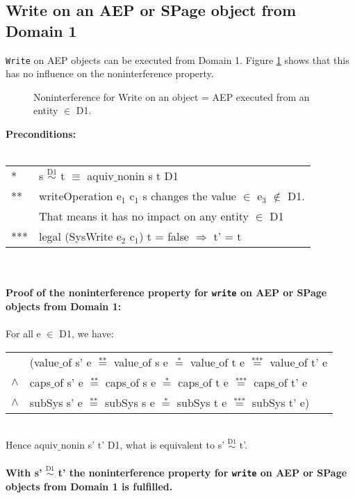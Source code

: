 \subsection{Write on an AEP or SPage object from Domain 1}\label{WriteOut2}
\texttt{Write} on AEP objects can be executed from Domain 1. Figure \ref{fig:WriteOut2} shows that this has no influence on the noninterference property.
\begin{figure}[H]
\caption{Noninterference for Write on an object = AEP executed from an entity $\in$ D1.}
\label{fig:WriteOut2}
\end{figure}
\textbf{Preconditions:} \\ \\
\begin{tabular}{ll}
* & s $\overset{\text{D1}}{\sim}$ t $\equiv$ aquiv$\_$nonin s t D1	\\ 
** & writeOperation e$_1$ c$_1$ s changes the value $\in$ e$_3$ $\notin$ D1. \\
& That means it has no impact on any entity $\in$ D1 \\ 
*** & legal (SysWrite e$_2$ c$_1$) t = false $\Rightarrow$ t' = t
\end{tabular} \\ \\ 
\textbf{Proof of the noninterference property for \texttt{write} on AEP or SPage objects from Domain 1:}\\ \\
For all e $\in$ D1, we have: \\ 
\begin{tabular}{ll}
& (value$\_$of s' e $\overset{\text{**}}{=}$ value$\_$of s e $\overset{\text{*}}{=}$ value$\_$of t e $\overset{\text{***}}{=}$ value$\_$of t' e \\
$\wedge$ & caps$\_$of s' e $\overset{\text{**}}{=}$ caps$\_$of s e $\overset{\text{*}}{=}$ caps$\_$of t e $\overset{\text{***}}{=}$ caps$\_$of t' e \\
$\wedge$ & subSys s' e $\overset{\text{**}}{=}$ subSys s e $\overset{\text{*}}{=}$ subSys t e $\overset{\text{***}}{=}$ subSys t' e)
\end{tabular} \\
Hence aquiv$\_$nonin s' t' D1, what is equivalent to s' $\overset{\text{D1}}{\sim}$ t'.\\ \\ 
\textbf{With s' $\overset{\text{D1}}{\sim}$ t' the noninterference property for \texttt{write} on AEP or SPage objects from Domain 1 is fulfilled.} 